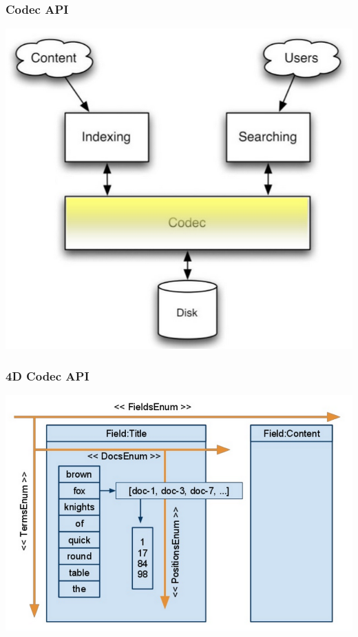 \documentclass{beamer}
\begin{document}
	\begin{frame}
		\frametitle{Codec API}
		\begin{center}
		\includegraphics[keepaspectratio=true,height=.70\paperheight]{resources/codecAPI.png}
		\end{center}
 	\end{frame}	
 	\begin{frame}
 		\frametitle{4D Codec API}
 		\begin{center}
		\includegraphics[keepaspectratio=true,height=.70\paperheight]{resources/4D.png}
		\end{center}
 	\end{frame}
\end{document}
